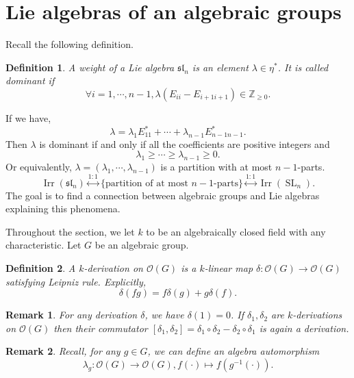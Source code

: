\documentclass[10pt]{article}
\newtheorem{definition}{Definition}[section]
\newtheorem{remark}{Remark}[section]
\numberwithin{equation}{theorem}
\DeclareMathOperator{\Irr}{Irr}
\DeclareMathOperator{\SL}{SL}
\newcommand{\Ouv}[0]{\mathcal{O}}
\newcommand{\Z}[0]{\mathbb{Z}}
\begin{document}
\section{Lie algebras of an algebraic groups}
Recall the following definition. 
\begin{definition}
  A weight of a Lie algebra $\mathfrak{sl}_n$ is an element $\lambda\in\eta^*$. It is called dominant if 
  \begin{equation*}
    \forall i=1,\cdots,n-1, \lambda(E_{ii}-E_{i+1i+1}) \in\Z_{\geq0}.
  \end{equation*}
\end{definition}
If we have,
\begin{equation*}
  \lambda = \lambda_1E_{11}^*+\cdots+\lambda_{n-1}E^*_{n-1n-1}.
\end{equation*}
Then $\lambda$ is dominant if and only if all the coefficients are positive integers and
\begin{equation*}
  \lambda_1\geq\cdots\geq\lambda_{n-1}\geq 0.
\end{equation*}
Or equivalently, $\lambda = (\lambda_1,\cdots,\lambda_{n-1})$ is a partition with at most $n-1$-parts.
\begin{equation*}
  \Irr(\mathfrak{sl}_n)\stackrel{1:1}{\leftrightarrow}\{\text{partition of at most $n-1$-parts}\}\stackrel{1:1}{\leftrightarrow}\Irr(\SL_n).
\end{equation*}
The goal is to find a connection between algebraic groups and Lie algebras explaining this phenomena.\\
\par Throughout the section, we let $k$ to be an algebraically closed field with any characteristic. Let $G$ be an algebraic group.
\begin{definition}
  \label{definition_5_1}
  A $k$-derivation on $\Ouv(G)$ is a $k$-linear map $\delta:\Ouv(G)\to\Ouv(G)$ satisfying Leipniz rule. Explicitly,
  \begin{equation*}
    \delta(fg) = f\delta(g)+g\delta(f).
  \end{equation*}
\end{definition}
\begin{remark}
  For any derivation $\delta$, we have $\delta(1) = 0$. If $\delta_1,\delta_2$ are $k$-derivations on $\Ouv(G)$ then their commutator $[\delta_1,\delta_2] =\delta_1\circ\delta_2-\delta_2\circ \delta_1$ is again a derivation. 
\end{remark}

\begin{remark}
  Recall, for any $g\in G$, we can define an algebra automorphism
  \begin{equation*}
    \lambda_g:\Ouv(G)\to\Ouv(G), f(\cdot)\mapsto f(g^{-1}(\cdot)).
  \end{equation*}
\end{remark}
\end{document}
